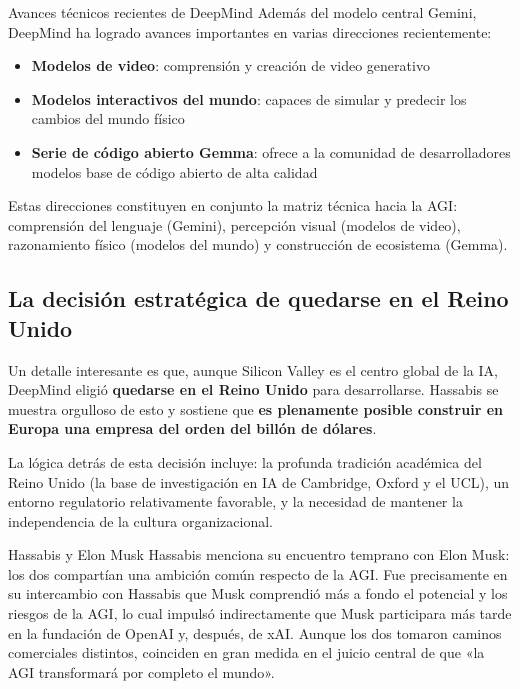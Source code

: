 \documentclass[a4paper]{article}
\begin{document}
\begin{knowledgebox}{Avances técnicos recientes de DeepMind}
Además del modelo central Gemini, DeepMind ha logrado avances importantes en varias direcciones recientemente:
\begin{itemize}
    \item \textbf{Modelos de video}: comprensión y creación de video generativo
    \item \textbf{Modelos interactivos del mundo}: capaces de simular y predecir los cambios del mundo físico
    \item \textbf{Serie de código abierto Gemma}: ofrece a la comunidad de desarrolladores modelos base de código abierto de alta calidad
\end{itemize}
Estas direcciones constituyen en conjunto la matriz técnica hacia la AGI: comprensión del lenguaje (Gemini), percepción visual (modelos de video), razonamiento físico (modelos del mundo) y construcción de ecosistema (Gemma).
\end{knowledgebox}

\subsection{La decisión estratégica de quedarse en el Reino Unido}

Un detalle interesante es que, aunque Silicon Valley es el centro global de la IA, DeepMind eligió \textbf{quedarse en el Reino Unido} para desarrollarse. Hassabis se muestra orgulloso de esto y sostiene que \textbf{es plenamente posible construir en Europa una empresa del orden del billón de dólares}.

La lógica detrás de esta decisión incluye: la profunda tradición académica del Reino Unido (la base de investigación en IA de Cambridge, Oxford y el UCL), un entorno regulatorio relativamente favorable, y la necesidad de mantener la independencia de la cultura organizacional.

\begin{knowledgebox}{Hassabis y Elon Musk}
Hassabis menciona su encuentro temprano con Elon Musk: los dos compartían una ambición común respecto de la AGI. Fue precisamente en su intercambio con Hassabis que Musk comprendió más a fondo el potencial y los riesgos de la AGI, lo cual impulsó indirectamente que Musk participara más tarde en la fundación de OpenAI y, después, de xAI. Aunque los dos tomaron caminos comerciales distintos, coinciden en gran medida en el juicio central de que «la AGI transformará por completo el mundo».
\end{knowledgebox}
\end{document}
